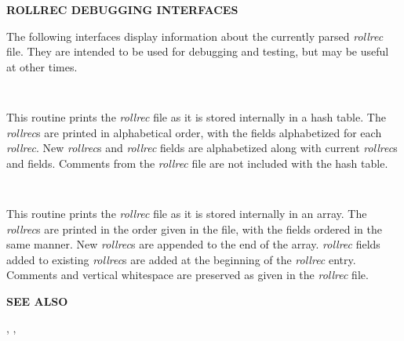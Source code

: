 {\bf ROLLREC DEBUGGING INTERFACES}

The following interfaces display information about the currently parsed {\it
rollrec} file.  They are intended to be used for debugging and testing, but
may be useful at other times.

\begin{description}

\item {}\verb" "

This routine prints the {\it rollrec} file as it is stored internally in a
hash table.  The {\it rollrec}s are printed in alphabetical order, with the
fields alphabetized for each {\it rollrec}.  New {\it rollrec}s and {\it
rollrec} fields are alphabetized along with current {\it rollrec}s and fields.
Comments from the {\it rollrec} file are not included with the hash table.

\item {}\verb" "

This routine prints the {\it rollrec} file as it is stored internally in an
array.  The {\it rollrec}s are printed in the order given in the file, with
the fields ordered in the same manner.  New {\it rollrec}s are appended to the
end of the array.  {\it rollrec} fields added to existing {\it rollrec}s are
added at the beginning of the {\it rollrec} entry.  Comments and vertical
whitespace are preserved as given in the {\it rollrec} file.

\end{description}

{\bf SEE ALSO}

,
,


